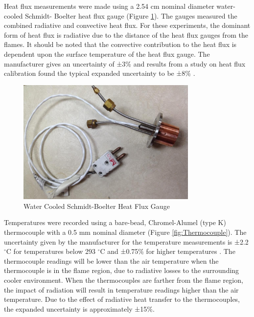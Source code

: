 \documentclass{article}
\begin{document}
Heat flux measurements were made using a 2.54 cm nominal diameter water-cooled Schmidt- Boelter heat flux gauge (Figure \ref{fig:HeatFluxGauge}). The gauges measured the combined radiative and convective heat flux. For these experiments, the dominant form of heat flux is radiative due to the distance of the heat flux gauges from the flames. It should be noted that the convective contribution to the heat flux is dependent upon the surface temperature of the heat flux gauge. The manufacturer gives an uncertainty of ±3\% and results from a study on heat flux calibration found the typical expanded uncertainty to be ±8\% \cite{HeatFluxRoundRobin}.

\begin{figure} [H]
	\centering
	\includegraphics[width = 3.5in]{0_Images/Instrumentation/Heat_Flux_Gauge.jpg}
	\caption{Water Cooled Schmidt-Boelter Heat Flux Gauge}
	\label{fig:HeatFluxGauge}
\end{figure}

Temperatures were recorded using a bare-bead, Chromel-Alumel (type K) thermocouple with a 0.5 mm nominal diameter (Figure \ref{fig:Thermocouple}). The uncertainty given by the manufacturer for the temperature measurements is ±2.2 $^{\circ}$C for temperatures below 293 $^{\circ}$C and ±0.75\% for higher temperatures \cite{TemperatureHandbook}. The thermocouple readings will be lower than the air temperature when the thermocouple is in the flame region, due to radiative losses to the surrounding cooler environment. When the thermocouples are farther from the flame region, the impact of radiation will result in temperature readings higher than the air temperature. Due to the effect of radiative heat transfer to the thermocouples, the expanded uncertainty is approximately ±15\%.
\end{document}

